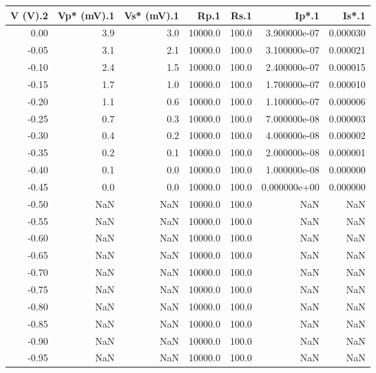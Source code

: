 \begin{tabular}{rrrrrrr}
\toprule
 V (V).2 &  Vp* (mV).1 &  Vs* (mV).1 &    Rp.1 &  Rs.1 &        Ip*.1 &    Is*.1 \\
\midrule
    0.00 &         3.9 &         3.0 & 10000.0 & 100.0 & 3.900000e-07 & 0.000030 \\
   -0.05 &         3.1 &         2.1 & 10000.0 & 100.0 & 3.100000e-07 & 0.000021 \\
   -0.10 &         2.4 &         1.5 & 10000.0 & 100.0 & 2.400000e-07 & 0.000015 \\
   -0.15 &         1.7 &         1.0 & 10000.0 & 100.0 & 1.700000e-07 & 0.000010 \\
   -0.20 &         1.1 &         0.6 & 10000.0 & 100.0 & 1.100000e-07 & 0.000006 \\
   -0.25 &         0.7 &         0.3 & 10000.0 & 100.0 & 7.000000e-08 & 0.000003 \\
   -0.30 &         0.4 &         0.2 & 10000.0 & 100.0 & 4.000000e-08 & 0.000002 \\
   -0.35 &         0.2 &         0.1 & 10000.0 & 100.0 & 2.000000e-08 & 0.000001 \\
   -0.40 &         0.1 &         0.0 & 10000.0 & 100.0 & 1.000000e-08 & 0.000000 \\
   -0.45 &         0.0 &         0.0 & 10000.0 & 100.0 & 0.000000e+00 & 0.000000 \\
   -0.50 &         NaN &         NaN & 10000.0 & 100.0 &          NaN &      NaN \\
   -0.55 &         NaN &         NaN & 10000.0 & 100.0 &          NaN &      NaN \\
   -0.60 &         NaN &         NaN & 10000.0 & 100.0 &          NaN &      NaN \\
   -0.65 &         NaN &         NaN & 10000.0 & 100.0 &          NaN &      NaN \\
   -0.70 &         NaN &         NaN & 10000.0 & 100.0 &          NaN &      NaN \\
   -0.75 &         NaN &         NaN & 10000.0 & 100.0 &          NaN &      NaN \\
   -0.80 &         NaN &         NaN & 10000.0 & 100.0 &          NaN &      NaN \\
   -0.85 &         NaN &         NaN & 10000.0 & 100.0 &          NaN &      NaN \\
   -0.90 &         NaN &         NaN & 10000.0 & 100.0 &          NaN &      NaN \\
   -0.95 &         NaN &         NaN & 10000.0 & 100.0 &          NaN &      NaN \\

\end{tabular}

